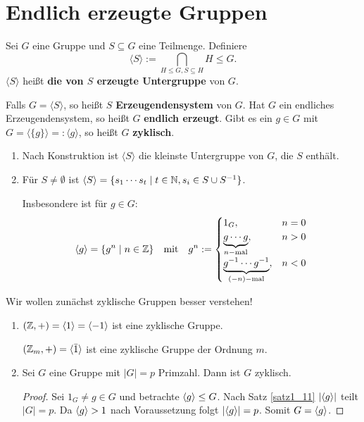 \section{Endlich erzeugte Gruppen}

\begin{definition}
	Sei $G$ eine Gruppe und $S \subseteq G$ eine Teilmenge. Definiere 
	\[\langle S \rangle := \bigcap_{H \leq G, S \subseteq H} H \leq G.\]
	$\langle S \rangle$ heißt \textbf{die von $S$ erzeugte Untergruppe} von $G$.
\end{definition}
Falls $G = \langle S \rangle$, so heißt $S$ \textbf{Erzeugendensystem} von $G$. Hat $G$ ein endliches Erzeugendensystem, so heißt $G$ \textbf{endlich erzeugt}. Gibt es ein $g \in G$ mit $G = \langle \{g\} \rangle =: \langle g \rangle$, so heißt $G$ \textbf{zyklisch}.
\begin{rem}
	\begin{enumerate}[label=(\roman*)]
		\item Nach Konstruktion ist $\langle S\rangle$ die kleinste Untergruppe von $G$, die $S$ enthält.
		\item Für $S \neq \emptyset$ ist $\langle S \rangle = \{s_1 \cdots s_t \mid t \in \mathbb{N}, s_i \in S \cup S^{-1}\}$. 
		
		Insbesondere ist für $g \in G$:
		\[\langle g \rangle = \{g^n \mid n \in \mathbb{Z}\} \quad\text{mit}\quad g^n := \begin{cases}
			1_G, & n = 0\\
			\underbrace{g \cdots g}_{n-\text{mal}}, & n > 0\\
			\underbrace{g^{-1} \cdots g^{-1}}_{(-n)-\text{mal}}, & n < 0 
		\end{cases}\]
\end{enumerate}
\begin{leftbar}
	Wir wollen zunächst zyklische Gruppen besser verstehen!
\end{leftbar}
\end{rem}
\begin{beispiel}\label{beispiel2_3}
	\begin{enumerate}[label=(\arabic*)]
		\item $(\mathbb{Z}, +) = \langle 1 \rangle = \langle -1 \rangle$ ist eine zyklische Gruppe.
		
		$(\mathbb{Z}_m, +) = \langle \bar{1} \rangle$ ist eine zyklische Gruppe der Ordnung $m$.
		
		\item Sei $G$ eine Gruppe mit $|G| = p$ Primzahl. Dann ist $G$ zyklisch.
		\begin{proof}
			Sei $1_G \neq g \in G$ und betrachte $\langle g \rangle \leq G$. Nach Satz \ref{satz1_11} $|\langle g \rangle|$ teilt $|G| = p$. Da $\langle g \rangle > 1$ nach Voraussetzung folgt $|\langle g \rangle| = p$. Somit $G = \langle g \rangle$.
		\end{proof}
	\end{enumerate}
\end{beispiel}
